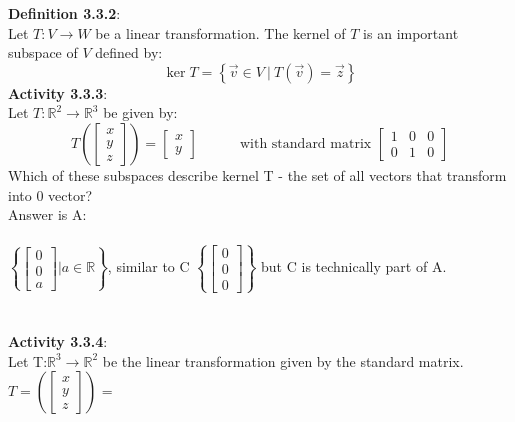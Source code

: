 \documentclass{article}
\begin{document}
\noindent \textbf{Definition 3.3.2}:\\
Let  $T: V \to W$ be a linear transformation. The kernel of $T$ is an important subspace of $V$ defined by:
\begin{equation*}
\ker T = \left\{ \vec{v} \in V\ \big|\ T(\vec{v})=\vec{z}\right\}
\end{equation*}
\noindent \textbf{Activity 3.3.3}:\\
Let $T: \mathbb{R}^2 \to \mathbb{R}^3$ be given by:\\
\begin{equation*}
T\left(\left[\begin{array}{c}x \\ y\\z \end{array}\right] \right)
=
\left[\begin{array}{c} x \\ y \end{array}\right]
\hspace{3em}
\text{with standard matrix }
\left[\begin{array}{ccc} 1 & 0 & 0 \\ 0 & 1 & 0 \end{array}\right]
\end{equation*}
Which of these subspaces describe kernel T - the set of all vectors that transform into 0 vector?\\
Answer is A:\\
\\
$\left\{ \begin{bmatrix} 0\\0\\a\end{bmatrix} \Bigg| a \in \mathbb{R} \right\}$, similar to C $\left\{ \begin{bmatrix} 0\\0\\0\end{bmatrix}  \right\}$ but C is technically part of A.\\
\\
\\
\noindent \textbf{Activity 3.3.4}:\\
Let T:$\mathbb{R}^{3} \rightarrow  \mathbb{R}^{2}$ be the linear transformation given by the standard matrix.\\
$T = 
\left(\left[\begin{matrix} 
x\\y\\z 
\end{matrix}\right]\right)$ = 
\end{document}
